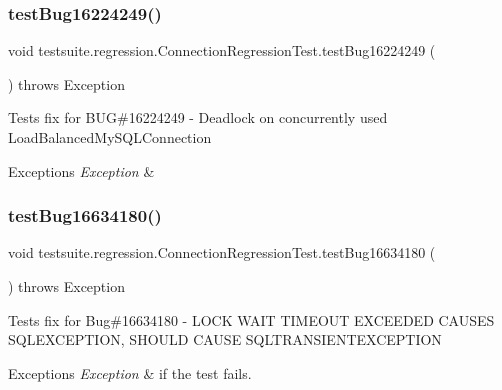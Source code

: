 \subsubsection{\texorpdfstring{test\+Bug16224249()}{testBug16224249()}}
{\footnotesize\ttfamily void testsuite.\+regression.\+Connection\+Regression\+Test.\+test\+Bug16224249 (\begin{DoxyParamCaption}{ }\end{DoxyParamCaption}) throws Exception}

Tests fix for B\+UG\#16224249 -\/ Deadlock on concurrently used Load\+Balanced\+My\+S\+Q\+L\+Connection


\begin{DoxyExceptions}{Exceptions}
{\em Exception} & \\
\hline
\end{DoxyExceptions}
\mbox{\label{classtestsuite_1_1regression_1_1_connection_regression_test_a93aad983034e220127a84017e297d492}} 
\subsubsection{\texorpdfstring{test\+Bug16634180()}{testBug16634180()}}
{\footnotesize\ttfamily void testsuite.\+regression.\+Connection\+Regression\+Test.\+test\+Bug16634180 (\begin{DoxyParamCaption}{ }\end{DoxyParamCaption}) throws Exception}

Tests fix for Bug\#16634180 -\/ L\+O\+CK W\+A\+IT T\+I\+M\+E\+O\+UT E\+X\+C\+E\+E\+D\+ED C\+A\+U\+S\+ES S\+Q\+L\+E\+X\+C\+E\+P\+T\+I\+ON, S\+H\+O\+U\+LD C\+A\+U\+SE S\+Q\+L\+T\+R\+A\+N\+S\+I\+E\+N\+T\+E\+X\+C\+E\+P\+T\+I\+ON


\begin{DoxyExceptions}{Exceptions}
{\em Exception} & if the test fails. \\
\hline
\end{DoxyExceptions}
\mbox{\label{classtestsuite_1_1regression_1_1_connection_regression_test_ad677d873884570b76279a42c590dbe5b}} 
